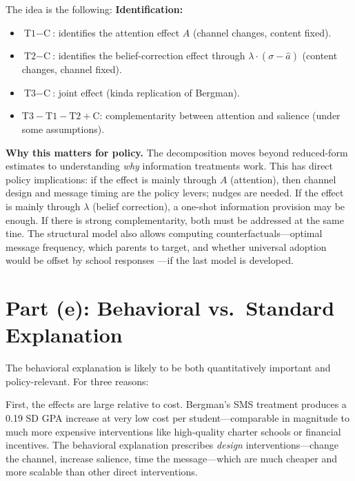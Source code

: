 \documentclass[11pt]{article}
\begin{document}
\medskip
The idea is the following: 
\noindent \textbf{Identification:}
\begin{itemize}
    \item $\text{T1} - \text{C}$: identifies the attention effect $A$ (channel changes, content fixed).
    \item $\text{T2} - \text{C}$: identifies the belief-correction effect through $\lambda \cdot (\sigma - \hat{a})$ (content changes, channel fixed).
    \item $\text{T3} - \text{C}$: joint effect (kinda replication of Bergman).
    \item $\text{T3} - \text{T1} - \text{T2} + \text{C}$: complementarity between attention and salience (under some assumptions). 
\end{itemize}

\medskip
\noindent \textbf{Why this matters for policy.} The decomposition moves beyond reduced-form estimates to understanding \emph{why} information treatments work. This has direct policy implications: if the effect is mainly through $A$ (attention), then channel design and message timing are the policy levers; nudges are needed. If the effect is mainly through $\lambda$ (belief correction), a one-shot information provision may be enough. If there is strong complementarity, both must be addressed at the same tine. The structural model also allows computing counterfactuals---optimal message frequency, which parents to target, and whether universal adoption would be offset by school responses ---if the last model is developed.

\section{Part (e): Behavioral vs.\ Standard Explanation}

The behavioral explanation is likely to be both quantitatively important and policy-relevant. For three reasons:

First, the effects are large relative to cost. Bergman's SMS treatment produces a 0.19 SD GPA increase at very low cost per student---comparable in magnitude to much more expensive interventions like high-quality charter schools or financial incentives. The behavioral explanation prescribes \emph{design} interventions---change the channel, increase salience, time the message---which are much cheaper and more scalable than other direct interventions.
\end{document}
